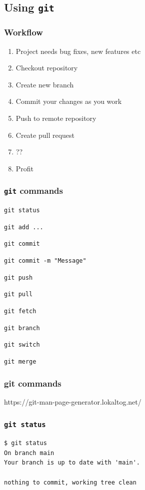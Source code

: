 \documentclass[presentation]{beamer}
\begin{document}
  \subsection{Using \texttt{git}}
  \begin{frame}
    \frametitle{Workflow}
    
    \begin{enumerate}
      \item Project needs bug fixes, new features etc
      \item Checkout repository
      \item Create new branch
      \item Commit your changes as you work
      \item Push to remote repository
      \item Create pull request
      \item ??
      \item Profit
    \end{enumerate}
  \end{frame}
  \begin{frame}
    \frametitle{\texttt{git} commands}

    \begin{description}
      \item \texttt{git status}
      \item \texttt{git add ...}
      \item \texttt{git commit}
      \item \texttt{git commit -m "Message"}    
      \item \texttt{git push}
      \item \texttt{git pull}
      \item \texttt{git fetch}
      \item \texttt{git branch}
      \item \texttt{git switch}
      \item \texttt{git merge}
    \end{description}
  \end{frame}

  \begin{frame}[standout]
    \frametitle{git commands}
    https://git-man-page-generator.lokaltog.net/   
  \end{frame}

  \begin{frame}[fragile]
    \frametitle{\texttt{git status}}
 
    \begin{lstlisting}
$ git status
On branch main
Your branch is up to date with 'main'.

nothing to commit, working tree clean
    \end{lstlisting}
  \end{frame}
\end{document}
